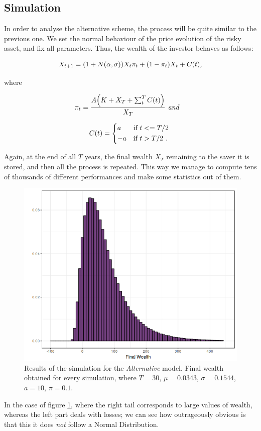 \subsection*{Simulation}

In order to analyse the alternative scheme, the process will be quite similar to the previous one. We set the normal behaviour of the price evolution of the risky asset, and fix all parameters. Thus, the wealth of the investor behaves as follows:

\begin{align}
    X_{t+1} = \qty(1+N(\alpha, \sigma))X_t \pi_t + \qty(1 - \pi_t)X_t + C(t) \textit{,}
\end{align}

where

\begin{align}
    \pi_t = \frac{A\qty(K + X_T + \sum_t^T C(t))}{X_T} & \textit{                           and}
\end{align}

\begin{equation*}
    C(t) =
    \begin{cases*}
      a & if $t <= T/2$ \\
      -a       & if $t > T/2$ \textit{.}
    \end{cases*}
\end{equation*}

Again, at the end of all $T$ years, the final wealth $X_T$ remaining to the saver it is stored, and then all the process is repeated. This way we manage to compute tens of thousands of different performances and make some statistics out of them.

\begin{figure}[H]
    \centering
    \includegraphics[scale=0.65]{./images/fw_alt.png}
    \caption{Results of the simulation for the \textit{Alternative} model. Final wealth obtained for every simulation, where $T=30$, $\mu = 0.0343$, $\sigma = 0.1544$, $a=10$, $\pi = 0.1$.}
    \label{fig:alt_fw}
\end{figure}

In the case of figure \ref{fig:alt_fw}, where the right tail corresponds to large values of wealth, whereas the left part deals with losses; we can see how outrageously obvious is that this it does \textit{not} follow a Normal Distribution.
